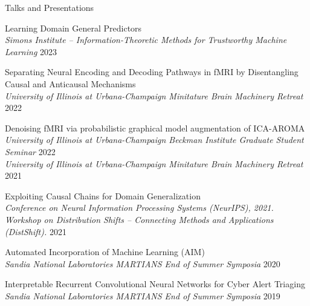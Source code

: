 \documentclass[11pt]{resume} %
\begin{document}

\begin{rSection}{Talks and Presentations}
\begin{etaremune}
    \item Learning Domain General Predictors \\
    \textit{Simons Institute -- Information-Theoretic Methods for Trustworthy Machine Learning} \hfill 2023
    \item Separating Neural Encoding and Decoding Pathways in fMRI by Disentangling Causal and Anticausal Mechanisms \\
    \textit{University of Illinois at Urbana-Champaign Minitature Brain Machinery Retreat} \hfill 2022

    \item Denoising fMRI via probabilistic graphical model augmentation of ICA-AROMA \\
    \textit{University of Illinois at Urbana-Champaign Beckman Institute Graduate Student Seminar} \hfill 2022\\
    \textit{University of Illinois at Urbana-Champaign Minitature Brain Machinery Retreat} \hfill 2021

    \item Exploiting Causal Chains for Domain Generalization\\
    \textit{Conference on Neural Information Processing Systems (NeurIPS),
     2021. Workshop on Distribution Shifts -- Connecting Methods and Applications (DistShift).} \hfill 2021 

    \item Automated Incorporation of Machine Learning (AIM)\\
    \textit{Sandia National Laboratories MARTIANS End of Summer Symposia} \hfill 2020

    \item Interpretable Recurrent Convolutional Neural Networks for Cyber Alert Triaging\\
    \textit{Sandia National Laboratories MARTIANS End of Summer Symposia} \hfill 2019
\end{etaremune}
\end{rSection}

\end{document}
